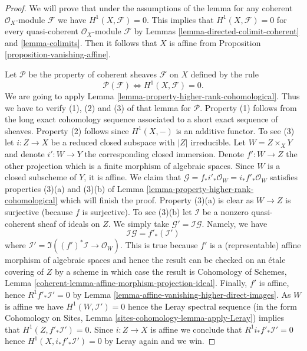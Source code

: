 \begin{proof}
We will prove that under the assumptions of the lemma for any coherent
$\mathcal{O}_X$-module $\mathcal{F}$ we have $H^1(X, \mathcal{F}) = 0$.
This implies that $H^1(X, \mathcal{F}) = 0$ for every quasi-coherent
$\mathcal{O}_X$-module $\mathcal{F}$ by
Lemmas \ref{lemma-directed-colimit-coherent} and \ref{lemma-colimits}.
Then it follows that $X$ is affine from
Proposition \ref{proposition-vanishing-affine}.

\medskip\noindent
Let $\mathcal{P}$ be the property of coherent sheaves
$\mathcal{F}$ on $X$ defined by the rule
$$
\mathcal{P}(\mathcal{F}) \Leftrightarrow H^1(X, \mathcal{F}) = 0.
$$
We are going to apply Lemma \ref{lemma-property-higher-rank-cohomological}.
Thus we have to verify (1), (2) and (3) of that lemma for $\mathcal{P}$.
Property (1) follows from the long exact cohomology sequence associated
to a short exact sequence of sheaves. Property (2) follows since
$H^1(X, -)$ is an additive functor. To see (3) let $i : Z \to X$ be
a reduced closed subspace with $|Z|$ irreducible. Let $W = Z \times_X Y$
and denote $i' : W \to Y$ the corresponding closed immersion.
Denote $f' : W \to Z$ the other projection which is a finite
morphism of algebraic spaces. Since $W$ is a closed subscheme of $Y$, it
is affine. We claim that
$\mathcal{G} = f_*i'_*\mathcal{O}_W = i_*f'_*\mathcal{O}_W$
satisfies properties (3)(a) and (3)(b) of
Lemma \ref{lemma-property-higher-rank-cohomological}
which will finish the proof. Property (3)(a) is clear as $W \to Z$ is
surjective (because $f$ is surjective). To see (3)(b) let
$\mathcal{I}$ be a nonzero quasi-coherent sheaf of ideals on $Z$.
We simply take $\mathcal{G}' = \mathcal{I} \mathcal{G}$.
Namely, we have
$$
\mathcal{I} \mathcal{G} = f'_*(\mathcal{I}')
$$
where $\mathcal{I}' = \Im((f')^*\mathcal{I} \to \mathcal{O}_W)$.
This is true because $f'$ is a (representable) affine morphism of
algebraic spaces and hence the result can be checked on an \'etale
covering of $Z$ by a scheme in which case the result is
Cohomology of Schemes, Lemma
\ref{coherent-lemma-affine-morphism-projection-ideal}.
Finally, $f'$ is affine, hence $R^1f'_*\mathcal{I}' = 0$ by
Lemma \ref{lemma-affine-vanishing-higher-direct-images}.
As $W$ is affine we have $H^1(W, \mathcal{I}') = 0$ hence the Leray
spectral sequence (in the form
Cohomology on Sites, Lemma \ref{sites-cohomology-lemma-apply-Leray})
implies that $H^1(Z, f'_*\mathcal{I}') = 0$.
Since $i : Z \to X$ is affine we conclude that
$R^1i_*f'_*\mathcal{I}' = 0$ hence $H^1(X, i_*f'_*\mathcal{I}') = 0$
by Leray again and we win.
\end{proof}









